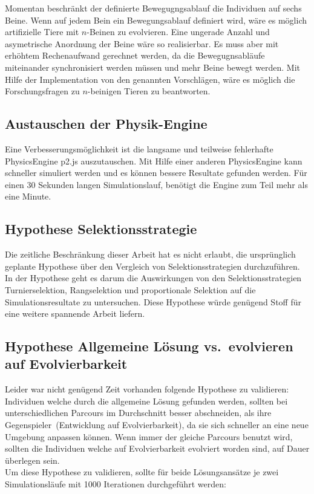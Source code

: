       Momentan beschränkt der definierte Bewegugngsablauf die Individuen auf sechs Beine.
      Wenn auf jedem Bein ein Bewegungsablauf definiert wird,
      wäre es möglich artifizielle Tiere mit \(n\)-Beinen zu evolvieren.
      Eine ungerade Anzahl und asymetrische Anordnung der Beine wäre so realisierbar.
      Es muss aber mit erhöhtem Rechenaufwand gerechnet werden,
      da die Bewegugnsabläufe miteinander synchronisiert werden müssen und mehr Beine bewegt werden.
      Mit Hilfe der Implementation von den genannten Vorschlägen, wäre es möglich die Forschungsfragen zu
      \(n\)-beinigen Tieren zu beantworten.

    \subsection{Austauschen der Physik-Engine}

      Eine Verbesserungsmöglichkeit ist die langsame und teilweise fehlerhafte \gls{PhysicsEngine} p2.js auszutauschen.
      Mit Hilfe einer anderen \gls{PhysicsEngine} kann schneller simuliert werden und
      es können bessere Resultate gefunden werden.
      Für einen 30 Sekunden langen Simulationslauf, benötigt die Engine zum Teil mehr als eine Minute.

    \subsection{Hypothese Selektionsstrategie\label{sub:hypoSelect}}

      Die zeitliche Beschränkung dieser Arbeit hat es nicht erlaubt,
      die ursprünglich geplante Hypothese über den Vergleich von Selektionsstrategien durchzuführen.
      In der Hypothese geht es darum die Auswirkungen von den Selektionsstrategien
      Turnierselektion, Rangselektion
      und proportionale Selektion auf die Simulationsresultate zu untersuchen.
      Diese Hypothese würde genügend Stoff für eine weitere spannende Arbeit liefern.

    \subsection{Hypothese Allgemeine Lösung vs.\ evolvieren auf Evolvierbarkeit\label{sub:hypoAnsatz}}

      Leider war nicht genügend Zeit vorhanden folgende Hypothese zu validieren:
      Individuen welche durch die allgemeine Lösung gefunden werden,
      sollten bei unterschiedlichen Parcours im Durchschnitt besser abschneiden,
      als ihre Gegenspieler~(Entwicklung auf Evolvierbarkeit),
      da sie sich schneller an eine neue Umgebung anpassen können.
      Wenn immer der gleiche Parcours benutzt wird,
      sollten die Individuen welche auf Evolvierbarkeit evolviert worden sind, auf Dauer überlegen sein.
      \\
      Um diese Hypothese zu validieren,
      sollte für beide Lösungsansätze je zwei Simulationsläufe mit 1000 Iterationen durchgeführt werden:

